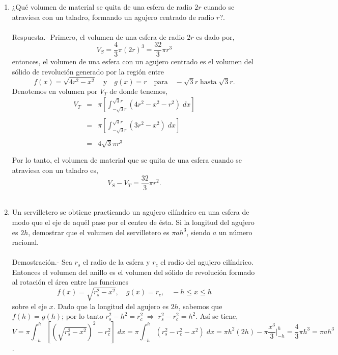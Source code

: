 \begin{enumerate}[ \bfseries 1.]
    \item ¿Qué volumen de material se quita de una esfera de radio $2r$ cuando se atraviesa con un taladro, formando un agujero centrado de radio $r$?.\\\\
	Respuesta.-\; Primero, el volumen de una esfera de radio $2r$ es dado por,
	$$V_S = \dfrac{4}{3}\pi(2r)^3 = \dfrac{32}{3}\pi r^3$$
	entonces, el volumen de una esfera con un agujero centrado es el volumen del sólido de revolución generado por la región entre $$f(x) = \sqrt{4r^2 - x^2}\quad \mbox{y} \quad g(x)=r \quad \mbox{para}\quad -\sqrt{3}r \; \mbox{hasta} \; \sqrt{3}r.$$ 
	Denotemos en volumen por $V_T$ de donde tenemos,
	$$\begin{array}{rcl}
	    V_T&=&\pi \left[\int_{-\sqrt{3}r}^{\sqrt{3}r}(4r^2-x^2 - r^2)\; dx\right]\\\\
	       &=&\pi \left[\int_{-\sqrt{3}r}^{\sqrt{3}r} (3r^2 - x^2)\; dx\right]\\\\
	       &=&4\sqrt{3}\pi r^3\\\\
	\end{array}$$
	Por lo tanto, el volumen de material que se quita de una esfera cuando se atraviesa con un taladro es,
	$$V_S - V_T = \dfrac{32}{3}\pi r^2.$$\\

    \item Un servilletero se obtiene practicando un agujero cilíndrico en una esfera de modo que el eje de aquél pase por el centro de ésta. Si la longitud del agujero es $2h$, demostrar que el volumen del servilletero es $\pi ah^3$, siendo $a$ un número racional.\\\\
	Demostración.-\; Sea $r_s$ el radio de la esfera y $r_c$ el radio del agujero cilíndrico. Entonces el volumen del anillo es el volumen del sólido de revolución formado al rotación el área entre las funciones 
	$$f(x) = \sqrt{r_s^2 - x^2}, \quad g(x)=r_c,\quad -h\leq x\leq h$$
	sobre el eje $x$. Dado que la longitud del agujero es $2h$, sabemos que $f(h)=g(h)$; por lo tanto $r_s^2 - h^2 = r_c^2 \; \Longrightarrow \; r_s^2 - r_c^2 = h^2.$ Así se tiene,
	$$V = \pi\int_{-h}^h \left[\left(\sqrt{r_s^2 - x^2}\right)^2 - r_c^2\right]\; dx = \pi \int_{-h}^h (r_s^2 - r_c^2 -x^2)\; dx = \pi h^2 (2h) - \pi \dfrac{x^3}{3}\bigg|_{-h}^h = \dfrac{4}{3}\pi h^3 = \pi a h^3$$.\\


\end{enumerate}
